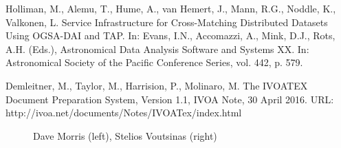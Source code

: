 \documentclass[final]{beamer}
\begin{document}
\begin{frame}[t]
\begin{multicols}{3}
\begin{thebibliography}{1}
   Holliman, M., Alemu, T., Hume, A., van Hemert, J., Mann, R.G., Noddle, K., Valkonen, L. Service Infrastructure for Cross-Matching Distributed Datasets Using OGSA-DAI and TAP. In: Evans, I.N., Accomazzi, A., Mink, D.J., Rots, A.H. (Eds.), Astronomical Data Analysis Software and Systems XX. In: Astronomical Society of the Pacific Conference Series, vol. 442, p. 579.

   Demleitner, M., Taylor, M., Harrision, P., Molinaro, M. The IVOATEX Document Preparation System, Version 1.1, IVOA Note, 30
April 2016. URL: http://ivoa.net/documents/Notes/IVOATex/index.html

  \end{thebibliography}
  


\begin{figure}
\hfill
{}
\hfill
\caption{Dave Morris (left), Stelios Voutsinas (right)}
\end{figure}


\end{multicols}

\end{frame}
\end{document}
